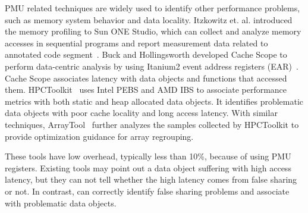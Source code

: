 PMU related techniques are widely used to identify other performance problems, such as memory system behavior and data locality. Itzkowitz et. al. introduced the memory profiling to Sun ONE Studio, which can collect and analyze memory accesses in sequential programs and report measurement data related to annotated code segment~\cite{DBLP:conf/sc/ItzkowitzWAK03}. Buck and Hollingsworth developed Cache Scope to perform data-centric analysis by using Itanium2 event address registers (EAR)~\cite{DBLP:conf/sc/BuckH04}. Cache Scope associates latency with data objects and functions that accessed them. HPCToolkit~\cite{ibs-sc} uses Intel PEBS and AMD IBS to associate performance metrics with both static and heap allocated data objects. It identifies problematic data objects with poor cache locality and long access latency. With similar techniques, ArrayTool~\cite{ibs-pact} further analyzes the samples collected by HPCToolkit to provide optimization guidance for array regrouping.

These tools have low overhead, typically less than 10\%, because of using PMU registers. Existing tools may point out a data object suffering with high access latency, but they can not tell whether the high latency comes from false sharing or not. In contrast, \cheetah{} can correctly identify false sharing problems and associate with problematic data objects.






